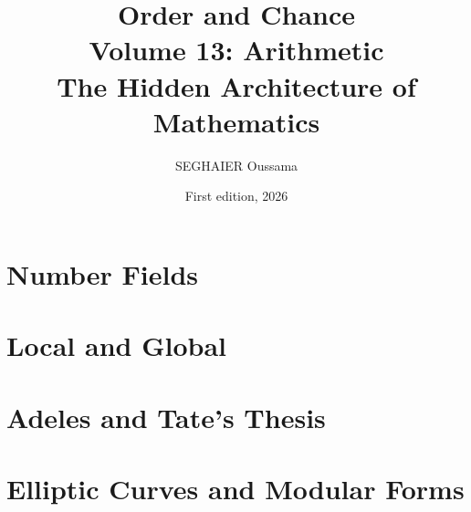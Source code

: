 \documentclass[11pt,openany]{book}
\title{\Huge\textbf{Order and Chance}\\[0.4em]\LARGE Volume 13: Arithmetic\\[0.6em]
\Large The Hidden Architecture of Mathematics}
\author{SEGHAIER Oussama}
\date{First edition, 2026}
\begin{document}
\frontmatter
\makecover
\maketitle

\tableofcontents

\mainmatter

\part{Number Fields}







\part{Local and Global}




\part{Adeles and Tate's Thesis}


\part{Elliptic Curves and Modular Forms}






\end{document}
